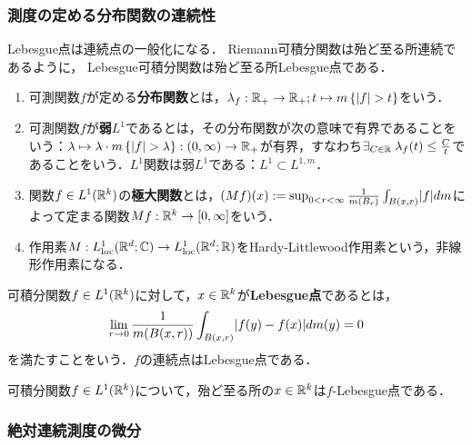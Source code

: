 \documentclass[uplatex,dvipdfmx]{jsreport}
\begin{document}
\subsubsection{測度の定める分布関数の連続性}

\begin{tcolorbox}[colframe=ForestGreen, colback=ForestGreen!10!white,breakable,colbacktitle=ForestGreen!40!white,coltitle=black,fonttitle=\bfseries\sffamily,
title=]
    Lebesgue点は連続点の一般化になる．
    Riemann可積分関数は殆ど至る所連続であるように，
    Lebesgue可積分関数は殆ど至る所Lebesgue点である．
\end{tcolorbox}

\begin{definition}\mbox{}
    \begin{enumerate}
        \item 可測関数$f$が定める\textbf{分布関数}とは，$\lambda_f:\mathbb{R}_+\to\mathbb{R}_+;t\mapsto m\left\{\lvert f\rvert>t\right\}$をいう．
        \item 可測関数$f$が\textbf{弱$L^1$}であるとは，その分布関数が次の意味で有界であることをいう：$\lambda\mapsto\lambda\cdot m\left\{\lvert f\rvert>\lambda\right\}:(0,\infty)\to\mathbb{R}_+$が有界，すなわち$\exists_{C\in\mathbb{R}}\;\lambda_f(t)\le\frac{C}{t}$であることをいう．$L^1$関数は弱$L^1$である：$L^1\subset L^{1,m}$．
        \item 関数$f\in L^1(\mathbb{R}^k)$の\textbf{極大関数}とは，$(Mf)(x):=\sup_{0<r<\infty}\frac{1}{m(B_r)}\int_{B(x,r)}\lvert f\rvert dm$によって定まる関数$Mf:\mathbb{R}^k\to[0,\infty]$をいう．
        \item 作用素$M:L_{\mathrm{loc}}^1(\mathbb{R}^d;\mathbb{C})\to L^1_{\mathrm{loc}}(\mathbb{R}^d;\mathbb{R})$をHardy-Littlewood作用素という，非線形作用素になる．
    \end{enumerate}
\end{definition}

\begin{definition}
    可積分関数$f\in L^1(\mathbb{R}^k)$に対して，$x\in\mathbb{R}^k$が\textbf{Lebesgue点}であるとは，
    \[\lim_{r\to0}\frac{1}{m(B(x,r))}\int_{B(x,r)}\lvert f(y)-f(x)\rvert dm(y)=0\]
    を満たすことをいう．$f$の連続点はLebesgue点である．
\end{definition}

\begin{theorem}[Lebesgue性は連続性のように扱える]
    可積分関数$f\in L^1(\mathbb{R}^k)$について，殆ど至る所の$x\in\mathbb{R}^k$は$f$-Lebesgue点である．
\end{theorem}

\subsubsection{絶対連続測度の微分}
\end{document}
